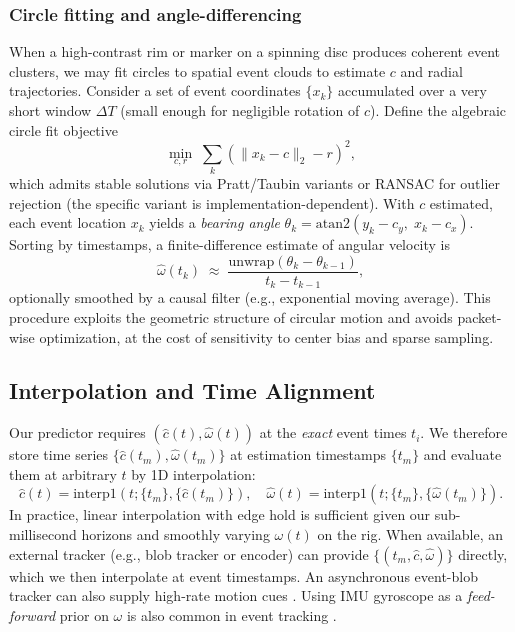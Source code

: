 \subsubsection{Circle fitting and angle-differencing}
When a high-contrast rim or marker on a spinning disc produces coherent event clusters, we may fit circles to spatial event clouds to estimate $c$ and radial trajectories. Consider a set of event coordinates $\{x_k\}$ accumulated over a very short window $\Delta T$ (small enough for negligible rotation of $c$). Define the algebraic circle fit objective
\begin{equation}
\min_{c,r}\;\sum_{k}\left(\|x_k - c\|_2 - r\right)^2,
\label{eq:circlefit}
\end{equation}
which admits stable solutions via Pratt/Taubin variants or RANSAC for outlier rejection (the specific variant is implementation-dependent). With $c$ estimated, each event location $x_k$ yields a \emph{bearing angle} $\theta_k = \mathrm{atan2}(y_k-c_y,\;x_k-c_x)$. Sorting by timestamps, a finite-difference estimate of angular velocity is
\begin{equation}
\hat\omega(t_k) \;\approx\; \frac{\mathrm{unwrap}\!\left(\theta_k-\theta_{k-1}\right)}{t_k - t_{k-1}},
\label{eq:angvel-diff}
\end{equation}
optionally smoothed by a causal filter (e.g., exponential moving average). This procedure exploits the geometric structure of circular motion and avoids packet-wise optimization, at the cost of sensitivity to center bias and sparse sampling.

\subsection{Interpolation and Time Alignment}
Our predictor requires $(\hat c(t),\hat\omega(t))$ at the \emph{exact} event times $t_i$. We therefore store time series $\{\hat c(t_m),\hat\omega(t_m)\}$ at estimation timestamps $\{t_m\}$ and evaluate them at arbitrary $t$ by 1D interpolation:
\begin{equation}
\hat c(t) \!=\! \mathrm{interp1}\!\left(t;\{t_m\},\{\hat c(t_m)\}\right),\quad
\hat\omega(t) \!=\! \mathrm{interp1}\!\left(t;\{t_m\},\{\hat\omega(t_m)\}\right).
\label{eq:interp}
\end{equation}
In practice, linear interpolation with edge hold is sufficient given our sub-millisecond horizons and smoothly varying $\omega(t)$ on the rig. When available, an external tracker (e.g., blob tracker or encoder) can provide $\{(t_m,\hat c,\hat\omega)\}$ directly, which we then interpolate at event timestamps. An asynchronous event-blob tracker can also supply high-rate motion cues \cite{Wang2024AEBTracker}. Using IMU gyroscope as a \emph{feed-forward} prior on $\omega$ is also common in event tracking \cite{Rebecq2017EVO,Wang2025Thesis}.

